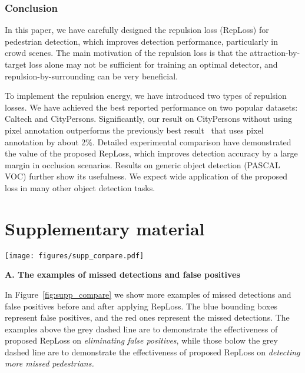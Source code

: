 \documentclass[10pt,twocolumn,letterpaper]{article}
\begin{document}
\section{Conclusion}
In this paper, we have carefully designed the repulsion loss (RepLoss) for pedestrian detection, which improves detection performance, particularly in crowd scenes. The main motivation of the repulsion loss is that the attraction-by-target loss alone may not be sufficient for training an optimal detector, and repulsion-by-surrounding can be very beneficial. 

To implement the repulsion energy, we have introduced two types of repulsion losses. We have achieved the best reported performance on two popular datasets: Caltech and CityPersons. Significantly, our result on CityPersons without using pixel annotation outperforms the previously best result~\cite{zhang2017citypersons} that uses pixel annotation by about 2\%. Detailed experimental comparison have demonstrated the value of the proposed RepLoss, which improves detection accuracy by a large margin in occlusion scenarios. Results on generic object detection (PASCAL VOC) further show its usefulness. We expect wide application of the proposed loss in many other object detection tasks.


{\small


}

{\small


}

\clearpage

\part*{Supplementary material}

\begin{figure*}[!tbp]
\centering
\texttt{[image: figures/supp\_compare.pdf]}
\caption{Comparison of baseline and RepLoss. The blue bounding boxes represent false positives, and the red ones represent the missed detections. On two sides of the grey dashed line, samples on the first row of each side are predictions of our baseline, while samples on the second row of each side are the predictions after adding the RepLoss.}
\label{fig:supp_compare}
\end{figure*}

\textbf{A. The examples of missed detections and false positives} 

In Figure~\ref{fig:supp_compare} we show more examples of missed detections and false positives before and after applying RepLoss. The blue bounding boxes represent false positives, and the red ones represent the missed detections. The examples above the grey dashed line are to demonstrate the effectiveness of proposed RepLoss on {\it eliminating false positives}, while those bolow the grey dashed line are to demonstrate the effectiveness of proposed RepLoss on {\it detecting more missed pedestrians.}
\par
\end{document}
